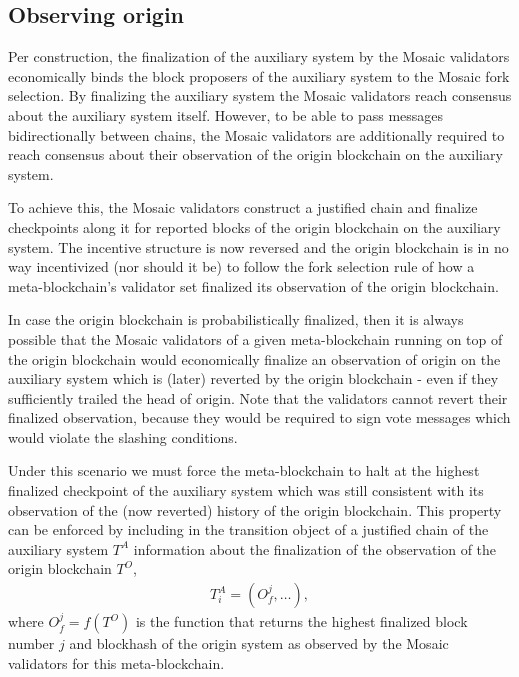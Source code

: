 \documentclass[12pt,a4paper]{article}
\begin{document}
\subsection{Observing origin}
\label{observing_origin}

Per construction, the finalization of the auxiliary system by the Mosaic validators economically binds the block proposers of the auxiliary system to the Mosaic fork selection.
By finalizing the auxiliary system the Mosaic validators reach consensus about the auxiliary system itself.
However, to be able to pass messages bidirectionally between chains, the Mosaic validators are additionally required to reach consensus about their observation of the origin blockchain on the auxiliary system.

To achieve this, the Mosaic validators construct a justified chain and finalize checkpoints along it for reported blocks of the origin blockchain on the auxiliary system.
The incentive structure is now reversed and the origin blockchain is in no way incentivized (nor should it be) to follow the fork selection rule of how a meta-blockchain's validator set finalized its observation of the origin blockchain.

In case the origin blockchain is probabilistically finalized, then it is always possible that the Mosaic validators of a given meta-blockchain running on top of the origin blockchain would economically finalize an observation of origin on the auxiliary system which is (later) reverted by the origin blockchain - even if they sufficiently trailed the head of origin.
Note that the validators cannot revert their finalized observation, because they would be required to sign vote messages which would violate the slashing conditions.

Under this scenario we must force the meta-blockchain to halt at the highest finalized checkpoint of the auxiliary system which was still consistent with its observation of the (now reverted) history of the origin blockchain.
This property can be enforced by including in the transition object of a justified chain of the auxiliary system $T^A$ information about the finalization of the observation of the origin blockchain $T^O$,
\begin{align*}
  T^A_i = (O^j_f, \dots),
\end{align*}
where $O^j_f = f(T^O)$ is the function that returns the highest finalized block number $j$ and blockhash of the origin system as observed by the Mosaic validators for this meta-blockchain.
\end{document}
